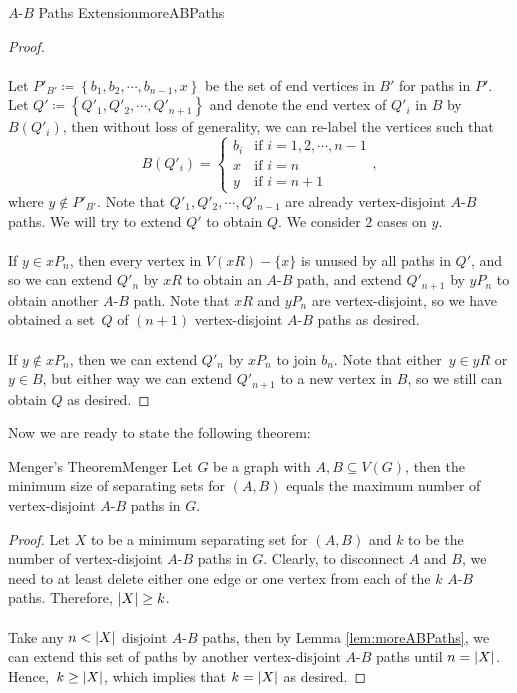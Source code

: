 \documentclass[math]{amznotes}
\theoremstyle{remark}
\begin{document}
\begin{lembox}{$A$-$B$ Paths Extension}{moreABPaths}
\begin{proof}
        \\\\
        Let $P'_{B'} \coloneqq \left\{b_1, b_2, \cdots, b_{n - 1}, x\right\}$ be the set of end vertices in $B'$ for paths in $P'$. Let $Q' \coloneqq \left\{Q'_1, Q'_2, \cdots, Q'_{n + 1}\right\}$ and denote the end vertex of $Q'_i$ in $B$ by $B(Q'_i)$, then without loss of generality, we can re-label the vertices such that 
        \begin{equation*}
            B(Q'_i) = \begin{cases}
                b_i & \textrm{if } i = 1, 2, \cdots, n - 1 \\
                x & \textrm{if } i = n \\
                y & \textrm{if } i = n + 1
            \end{cases},
        \end{equation*}
        where $y \notin P'_{B'}$. Note that $Q'_1, Q'_2, \cdots, Q'_{n - 1}$ are already vertex-disjoint $A$-$B$ paths. We will try to extend $Q'$ to obtain $Q$. We consider $2$ cases on $y$.
        \\\\
        If $y \in xP_n$, then every vertex in $V(xR) - \{x\}$ is unused by all paths in $Q'$, and so we can extend $Q'_n$ by $xR$ to obtain an $A$-$B$ path, and extend $Q'_{n + 1}$ by $yP_n$ to obtain another $A$-$B$ path. Note that $xR$ and $yP_n$ are vertex-disjoint, so we have obtained a set~$Q$ of $(n + 1)$ vertex-disjoint $A$-$B$ paths as desired.
        \\\\
        If $y \notin xP_n$, then we can extend $Q'_n$ by $xP_n$ to join $b_n$. Note that either~$y \in yR$ or $y \in B$, but either way we can extend $Q'_{n + 1}$ to a new vertex in $B$, so we still can obtain $Q$ as desired.
    \end{proof}
\end{lembox}
Now we are ready to state the following theorem:
\begin{thmbox}{Menger's Theorem}{Menger}
    Let $G$ be a graph with $A, B \subseteq V(G)$, then the minimum size of separating sets for $(A, B)$ equals the maximum number of vertex-disjoint $A$-$B$ paths in $G$.
    \tcblower
    \begin{proof}
        Let $X$ to be a minimum separating set for $(A, B)$ and $k$ to be the number of vertex-disjoint $A$-$B$ paths in $G$. Clearly, to disconnect $A$ and $B$, we need to at least delete either one edge or one vertex from each of the $k$ $A$-$B$ paths. Therefore, ${\left\lvert {X} \right\rvert} \geq k$.
        \\\\
        Take any $n < {\left\lvert {X} \right\rvert}$ disjoint $A$-$B$ paths, then by Lemma \ref{lem:moreABPaths}, we can extend this set of paths by another vertex-disjoint $A$-$B$ paths until $n = {\left\lvert {X} \right\rvert}$. Hence,~$k \geq {\left\lvert {X} \right\rvert}$, which implies that $k = {\left\lvert {X} \right\rvert}$ as desired.
    \end{proof}
\end{thmbox}
\end{document}
